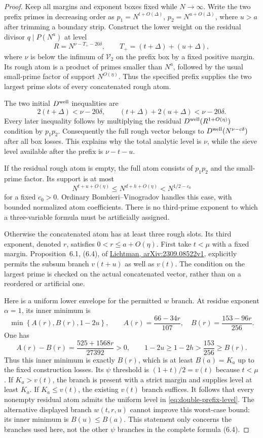 \documentclass[11pt]{article}
\begin{document}
\begin{proof}
Keep all margins and exponent boxes fixed while $N\to\infty$.
Write the two prefix primes in decreasing order as
$p_1=N^{t+O(\Delta)}$, $p_2=N^{u+O(\Delta)}$, where
$u>a$ after trimming a boundary strip. Construct the lower weight
on the residual divisor $q\mid P(N^a)$ at level
\[
 R=N^{\nu-T_+-20\delta},
 \qquad T_+=(t+\Delta)+(u+\Delta),
\]
where $\nu$ is below the infimum of $\mathcal V_2$ on the
prefix box by a fixed positive margin. Its rough atom is a product
of primes smaller than $N^a$, followed by the usual small-prime
factor of support $N^{O(\eta)}$.
Thus the specified prefix supplies the two largest prime slots
of every concatenated rough atom.

The two initial $D^{\rm well}$ inequalities are
\[
 2(t+\Delta)<\nu-20\delta,
 \qquad (t+\Delta)+2(u+\Delta)<\nu-20\delta.
\]
Every later inequality follows by multiplying the residual
$D^{\rm well}(R^{1+O(\eta)})$ condition by $p_1p_2$.
Consequently the full rough vector belongs to
$D^{\rm well}(N^{\nu-c\delta})$ after all box losses.
This explains why the total analytic level is $\nu$, while the
sieve level available after the prefix is $\nu-t-u$.

If the residual rough atom is empty, the full atom consists of
$p_1p_2$ and the small-prime factor. Its support is at most
\[
 N^{t+u+O(\eta)}\le N^{d+h+O(\eta)}<N^{1/2-c_0}
\]
for a fixed $c_0>0$. Ordinary Bombieri--Vinogradov handles this
case, with bounded normalized atom coefficients. There is no
third-prime exponent to which a three-variable formula must be
artificially assigned.

Otherwise the concatenated atom has at least three rough slots.
Its third exponent, denoted $r$, satisfies
$0<r\le a+O(\eta)$. First take $t<\mu$ with a fixed margin.
Proposition~6.1, (6.4), of
\href{https://arxiv.org/pdf/2309.08522v1}
{Lichtman, arXiv:2309.08522v1}, explicitly permits the
subsum branch $v(t+u)$ as well as $v(t)$.
The condition on the largest prime is checked on the actual
concatenated vector, rather than on a reordered or artificial one.

Here is a uniform lower envelope for the permitted $w$ branch.
At residue exponent $\alpha=1$, its inner minimum is
\[
 \min\left\{A(r),B(r),1-2u\right\},
 \qquad A(r)=\frac{66-34r}{107},\quad
 B(r)=\frac{153-96r}{256}.
\]
One has
\[
 A(r)-B(r)=\frac{525+1568r}{27392}>0,
 \qquad 1-2u\ge1-2h>\frac{153}{256}\ge B(r).
\]
Thus this inner minimum is exactly $B(r)$, which is at least
$B(a)=K_a$ up to the fixed construction losses.
Its $\psi$ threshold is $(1+t)/2=v(t)$ because $t<\mu$.
If $K_a>v(t)$, the branch is present with a strict margin and
supplies level at least $K_a$. If $K_a\le v(t)$, the existing
$v(t)$ branch suffices. It follows that every nonempty residual
atom admits the uniform level in \eqref{eq:double-prefix-level}.
The alternative displayed branch $w(t,r,u)$ cannot improve
this worst-case bound: its inner minimum is $B(u)\le B(a)$.
This statement only concerns the branches used here, not the
other $\psi$ branches in the complete formula (6.4).


\end{proof}
\end{document}
